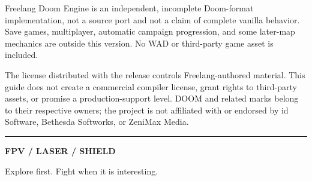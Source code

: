 \documentclass[10pt]{article}
\begin{document}
Freelang Doom Engine is an independent, incomplete Doom-format implementation,
not a source port and not a claim of complete vanilla behavior. Save games,
multiplayer, automatic campaign progression, and some later-map mechanics are
outside this version. No WAD or third-party game asset is included.

The license distributed with the release controls Freelang-authored material.
This guide does not create a commercial compiler license, grant rights to
third-party assets, or promise a production-support level. DOOM and related
marks belong to their respective owners; the project is not affiliated with or
endorsed by id Software, Bethesda Softworks, or ZeniMax Media.

\vfill
{\color{LaserGreen}\rule{\linewidth}{3pt}}
\begin{center}
{\sffamily\bfseries\large FPV / LASER / SHIELD}\par
{\small\color{Muted} Explore first. Fight when it is interesting.}
\end{center}
\end{document}
